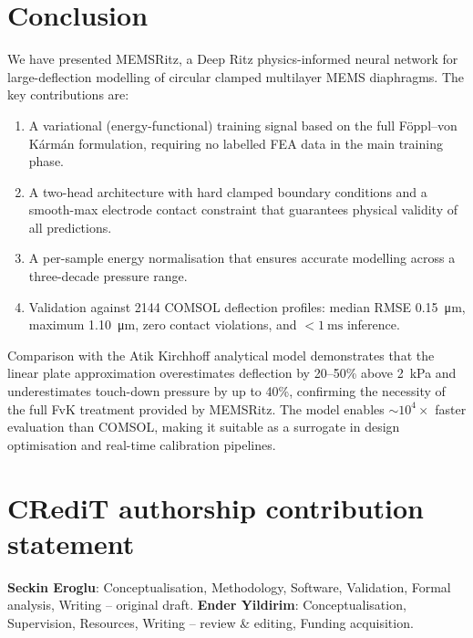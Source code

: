 \documentclass[review,12pt]{elsarticle}
\begin{document}
\section{Conclusion}
\label{sec:conclusion}

We have presented MEMSRitz, a Deep Ritz physics-informed neural network for
large-deflection modelling of circular clamped multilayer MEMS diaphragms.
The key contributions are:

\begin{enumerate}
    \item A variational (energy-functional) training signal based on the full
          Föppl–von Kármán formulation, requiring no labelled FEA data in the
          main training phase.
    \item A two-head architecture with hard clamped boundary conditions and a
          smooth-max electrode contact constraint that guarantees physical
          validity of all predictions.
    \item A per-sample energy normalisation that ensures accurate modelling
          across a three-decade pressure range.
    \item Validation against 2144 COMSOL deflection profiles: median RMSE
          \SI{0.15}{\micro\metre}, maximum \SI{1.10}{\micro\metre},
          zero contact violations, and $<\SI{1}{\milli\second}$ inference.
\end{enumerate}

Comparison with the Atik Kirchhoff analytical model demonstrates that the
linear plate approximation overestimates deflection by 20–50\% above
\SI{2}{\kilo\pascal} and underestimates touch-down pressure by up to 40\%,
confirming the necessity of the full FvK treatment provided by MEMSRitz.
The model enables $\sim 10^4\times$ faster evaluation than COMSOL, making it
suitable as a surrogate in design optimisation and real-time calibration
pipelines.

\section*{CRediT authorship contribution statement}

\textbf{Seckin Eroglu}: Conceptualisation, Methodology, Software, Validation,
Formal analysis, Writing -- original draft. \textbf{Ender Yildirim}:
Conceptualisation, Supervision, Resources, Writing -- review \& editing,
Funding acquisition.
\end{document}
